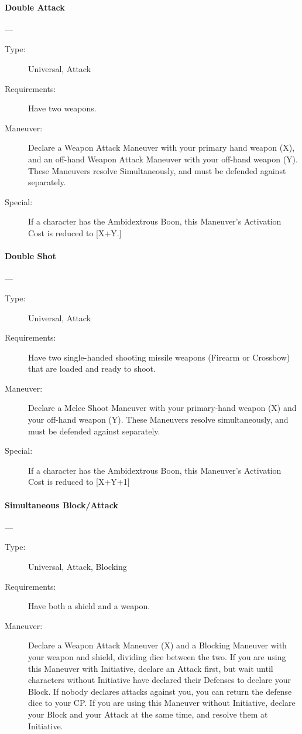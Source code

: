 \documentclass[oneside,11pt,english]{book}
\begin{document}
\paragraph{\large\label{man:Double Attack}Double Attack}---\quad{\large[X+Y+1]}
\vspace{-10pt}\begin{description} 
\item [Type:] Universal, Attack
\item [Requirements:] Have two weapons.
\item [Maneuver:] Declare a Weapon Attack Maneuver with your primary hand weapon (X), and an off-hand 
  Weapon Attack Maneuver with your off-hand weapon (Y). These Maneuvers resolve Simultaneously, and must be defended against separately. 
\item [Special:] If a character has the Ambidextrous Boon, this Maneuver’s Activation Cost is reduced to [X+Y.] 
\end{description}

\paragraph{\large\label{man:Double Shot}Double Shot}---\quad{\large[X+Y+2]}
\vspace{-10pt}\begin{description} 
\item [Type:] Universal, Attack 
\item [Requirements:] Have two single-handed shooting missile weapons (Firearm or Crossbow) that are loaded 
  and ready to shoot. 
\item [Maneuver:] Declare a Melee Shoot Maneuver with your primary-hand weapon (X) and your off-hand 
  weapon (Y). These Maneuvers resolve simultaneously, and must be defended against separately. 
\item [Special:] If a character has the Ambidextrous Boon, this Maneuver’s Activation Cost is reduced to 
  [X+Y+1] 
\end{description}
\paragraph{\large\label{man:Simultaneous Block/Attack}Simultaneous Block/Attack}---\quad{\large[X+Y]}
\vspace{-10pt}\begin{description} 
\item [Type:] Universal, Attack, Blocking 
\item [Requirements:] Have both a shield and a weapon. 
\item [Maneuver:] Declare a Weapon Attack Maneuver (X) and a Blocking Maneuver with your weapon and 
  shield, dividing dice between the two. 
  If you are using this Maneuver with Initiative, declare an Attack first, but wait until characters without 
  Initiative have declared their Defenses to declare your Block. If nobody declares attacks against you, you 
  can return the defense dice to your CP. 
  If you are using this Maneuver without Initiative, declare your Block and your Attack at the same time, 
  and resolve them at Initiative. 
\end{description}
\end{document}
